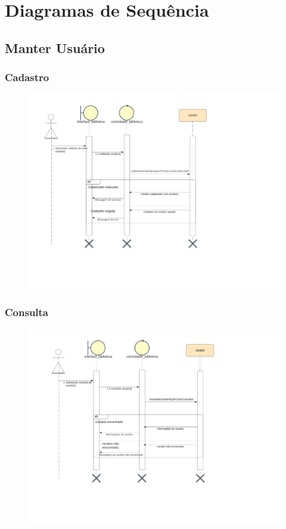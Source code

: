 \chapter{Diagramas de Sequência}

\section{Manter Usuário} 

\subsection{Cadastro}

\begin{figure}[h]
    \centering
    \includegraphics[width=1.0\linewidth]{Imagens/CadastrarUsuario-sequencia.pdf}
\end{figure}

\newpage

\subsection{Consulta}

\begin{figure}[h]
    \centering
    \includegraphics[width=1.0\linewidth]{Imagens/ConsultarUsuario-sequencia.pdf}
\end{figure}

